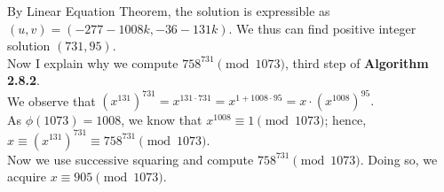 \noindent
By Linear Equation Theorem, the solution is expressible as $(u, v) = (-277 - 1008k, -36 - 131k)$. We thus can find positive integer solution $(731, 95)$. \\
Now I explain why we compute $758^{731} \pmod{1073}$, third step of \textbf{Algorithm 2.8.2}. \\
We observe that $(x^{131})^{731} = x^{131 \cdot 731} = x^{1 + 1008 \cdot 95} = x \cdot (x^{1008})^{95}.$ \\
As $\phi(1073) = 1008$, we know that $x^{1008}\equiv 1 \pmod{1073}$; hence, $x\equiv (x^{131})^{731}\equiv 758^{731} \pmod{1073}$. \\
Now we use successive squaring and compute $758^{731} \pmod{1073}$. Doing so, we acquire $x\equiv 905 \pmod{1073}$.